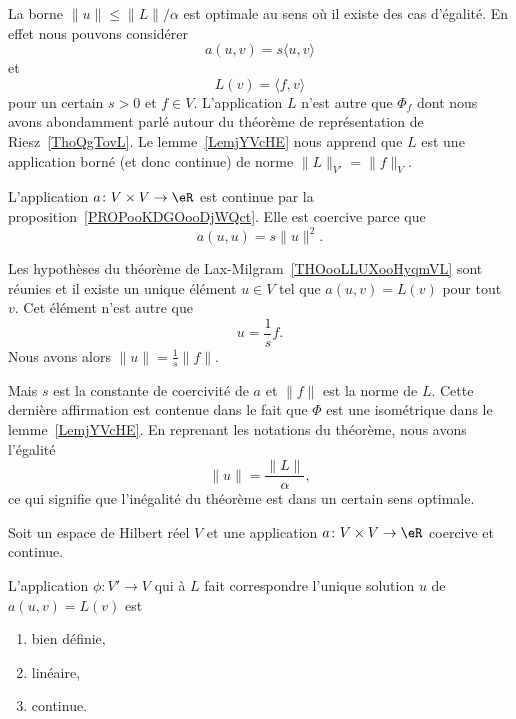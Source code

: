 \begin{example}      \label{EXooTTBDooUNhBOc}
    La borne \( \| u \|\leq \| L \|/\alpha\) est optimale au sens où il existe des cas d'égalité. En effet nous pouvons considérer
    \begin{equation}
        a(u,v)=s\langle u, v\rangle
    \end{equation}
    et
    \begin{equation}
        L(v)=\langle f, v\rangle
    \end{equation}
    pour un certain \( s>0\) et \( f\in V\). L'application \( L\) n'est autre que \( \Phi_f\) dont nous avons abondamment parlé autour du théorème de représentation de Riesz~\ref{ThoQgTovL}. Le lemme~\ref{LemjYVcHE} nous apprend que \( L\) est une application borné (et donc continue) de norme \( \| L \|_{V'}=\| f \|_V\).

    L'application \( a\colon V\times V\to \eR\) est continue par la proposition~\ref{PROPooKDGOooDjWQct}. Elle est coercive parce que
    \begin{equation}
        a(u,u)=s\| u \|^2.
    \end{equation}

    Les hypothèses du théorème de Lax-Milgram~\ref{THOooLLUXooHyqmVL} sont réunies et il existe un unique élément \(u\in V\) tel que \( a(u,v)=L(v)\) pour tout \( v\). Cet élément n'est autre que
    \begin{equation}
        u=\frac{1}{ s }f.
    \end{equation}
    Nous avons alors \( \| u \|=\frac{1}{ s }\| f \|\).

    Mais \( s\) est la constante de coercivité de \( a\) et \( \| f \|\) est la norme de \( L\). Cette dernière affirmation est contenue dans le fait que \( \Phi\) est une isométrique dans le lemme~\ref{LemjYVcHE}. En reprenant les notations du théorème, nous avons l'égalité
    \begin{equation}
        \| u \|=\frac{ \| L \| }{ \alpha },
    \end{equation}
    ce qui signifie que l'inégalité du théorème est dans un certain sens optimale.
\end{example}

\begin{proposition} \label{PROPooFEOZooTNPcBJ}
    Soit un espace de Hilbert réel \( V\) et une application \( a\colon V\times V\to \eR\) coercive et continue.

    L'application \( \phi\colon V'\to V\) qui à \( L\) fait correspondre l'unique solution \( u\) de \( a(u,v)=L(v)\) est
    \begin{enumerate}
        \item
            bien définie,
        \item
            linéaire,
        \item
            continue.
    \end{enumerate}
\end{proposition}

